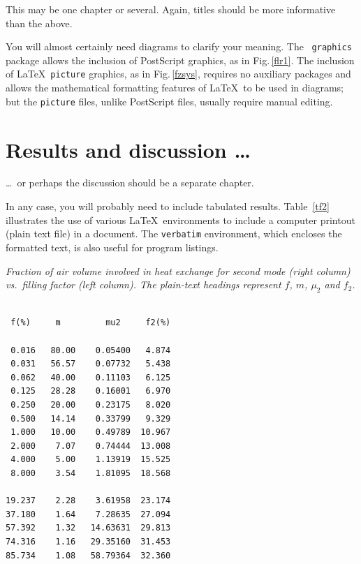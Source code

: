 \documentclass[12pt,openany,a4paper]{book}
\renewcommand{\baselinestretch}{1.2}	%
\newcommand{\fig}[1]  {Fig.\,\ref{#1}}		%
\newcommand{\tab}[1]  {Table~\ref{#1}}		%
\begin{document}
This may be one chapter or several.  Again, titles should be more
informative than the above.

You will almost certainly need diagrams to clarify your meaning.  The
\LaTeXe\ \texttt{graphics} package allows the inclusion of PostScript
graphics, as in \fig{flr1}.  The inclusion of \LaTeX\ \texttt{picture}
graphics, as in \fig{fzsys}, requires no auxiliary packages and allows
the mathematical formatting features of \LaTeX\ to be used in
diagrams; but the \texttt{picture} files, unlike PostScript files,
usually require manual editing.





\chapter{Results and discussion \ldots}

\ldots\ or perhaps the discussion should be a separate chapter.

In any case, you will probably need to include tabulated results.
\tab{tf2} illustrates the use of various \LaTeX\ environments to
include a computer printout (plain text file) in a document.  The
\texttt{verbatim} environment, which encloses the formatted text, is
also useful for program listings.

\begin{table}\renewcommand{\baselinestretch}{1.0}
\caption{\sl Fraction of air volume involved in heat exchange for
second mode (right column) vs.\ filling factor (left column).  The
plain-text headings represent $f$, $m$, $\mu_2$ and $f_2$.}
\label{tf2}

\begin{center}
\begin{minipage}[c]{2.85in}\small\normalsize
\begin{verbatim}

 f(%)     m         mu2     f2(%)

 0.016   80.00    0.05400   4.874
 0.031   56.57    0.07732   5.438
 0.062   40.00    0.11103   6.125
 0.125   28.28    0.16001   6.970
 0.250   20.00    0.23175   8.020
 0.500   14.14    0.33799   9.329
 1.000   10.00    0.49789  10.967
 2.000    7.07    0.74444  13.008
 4.000    5.00    1.13919  15.525
 8.000    3.54    1.81095  18.568

19.237    2.28    3.61958  23.174
37.180    1.64    7.28635  27.094
57.392    1.32   14.63631  29.813
74.316    1.16   29.35160  31.453
85.734    1.08   58.79364  32.360
\end{verbatim}
\end{minipage}
\end{center}
\end{table}
\end{document}

